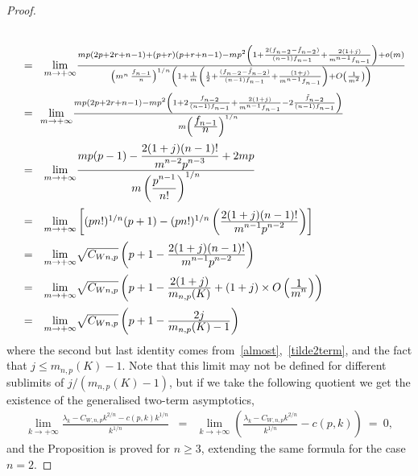 \documentclass[10pt,a4paper]{amsart}
\newcommand{\bo}{{\rm O}}
\newcommand{\ds}{\displaystyle}
\newcommand{\eqskip}{ \vspace*{2mm}\\ }
\newcommand{\fr}[2]{\frac{\ds #1}{\ds #2}}
\newcommand{\so}{{\rm o}}
\begin{document}
\begin{proof}
\begin{gather*}
\begin{array}{lll}
{{}}\nonumber\eqskip
&=& {\ds\lim_{m\to +\infty}}\frac{ mp(2p+2r+n-1)+(p+r)(p+r+n-1)-{mp^2}\left(1
+\frac{2(f_{n-2}-\tilde{f}_{n-2})}{(n-1)f_{n-1}} +
\frac{2(1+j)}{m^{n-1}f_{n-1}}\right)+\so(m)}{
\left(m^n\,\frac{f_{n-1}}{n}\right)^{1/n}\left( 1 +\frac{1}{m}\left(\frac{1}{2}
+\frac{(f_{n-2}-\tilde{f}_{n-2})}{(n-1)f_{n-1}} +\frac{(1+j)}{m^{n-1}f_{n-1}}\right)+\bo\left(\frac{1}{m^2}\right)\right)
}\nonumber\eqskip
&=&\!\! {\ds\lim_{m\to +\infty}}
 \frac{mp(2p+2r+n-1)-{mp^2}
\left(1+2\frac{f_{n-2}}{(n-1)f_{n-1}} +
\frac{2(1+j)}{m^{n-1}f_{n-1}}
-2\frac{\tilde{f}_{n-2}}{(n-1)f_{n-1}}\right)
}
{m\left(\fr{f_{n-1}}{n}\right)^{1/n}}\eqskip
&=& {\ds\lim_{m\to +\infty}} \fr{mp(p-1)-\fr{2(1+j)(n-1)!}{m^{n-2}p^{n-3}}+2mp}{m\left(\fr{p^{n-1}}{n!}\right)^{1/n}}\eqskip
&=& {\ds\lim_{m\to +\infty}} \left[
(pn!)^{1/n}(p+1)-(pn!)^{1/n}\left(\fr{2(1+j)(n-1)!}{m^{n-1}p^{n-2}}\right)\right]\eqskip
&=&  {\ds\lim_{m\to +\infty}}
\sqrt{C_{W n,p}}\left( p+1-\fr{2(1+j)(n-1)!}{m^{n-1}p^{n-2}}\right)\eqskip
&=& {\ds\lim_{m\to +\infty}}
\sqrt{C_{W n,p}}\left( p+1-\fr{2(1+j)}{m_{n,p}(K)}+(1+ j)\times \bo\left(\fr{1}{m^n}\right)\right)  \eqskip
&=& {\ds\lim_{m \to +\infty}}
\sqrt{C_{W n,p}}\left( p+1-\fr{2j}{m_{n,p}(K)-1}\right)
\end{array}
\end{gather*}
where the second but last identity comes from~\eqref{almost},~\eqref{tilde2term}, and the fact that
 $j\leq m_{n,p}(K)-1$.
 Note that this limit may not be defined for different sublimits of $j/(m_{n,p}(K)-1)$, but if we take the following quotient we get the existence of the generalised two-term asymptotics,
\begin{eqnarray*}
\lim_{k\to +\infty}\frac{\lambda_k-C_{W,n,p}k^{2/n}- c(p,k)k^{1/n}}{k^{1/n}} &=&\lim_{k\to +\infty}\left(\frac{\lambda_k-C_{W,n,p}k^{2/n}}{k^{1/n}}- c(p,k)\right)~
 =~0,
\end{eqnarray*}
and the Proposition is proved for $n\geq 3$, extending the  same formula for the case $n=2$. 
\end{proof}
\end{document}

